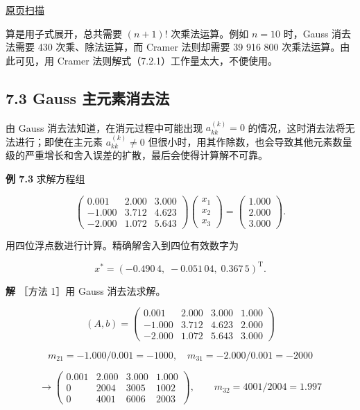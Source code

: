 \documentclass[
  10pt,
  fontset=fandol]{ctexart}
\begin{document}
\href{../../source-images/pdf-184.jpeg}{原页扫描}

算是用子式展开，总共需要 \((n+1)!\) 次乘法运算。例如 \(n=10\) 时，Gauss 消去法需要 430 次乘、除法运算，而 Cramer 法则却需要 39 916 800 次乘法运算。由此可见，用 Cramer 法则解式（7.2.1）工作量太大，不便使用。

\subsection{7.3 Gauss 主元素消去法}\label{gauss-ux4e3bux5143ux7d20ux6d88ux53bbux6cd5}

由 Gauss 消去法知道，在消元过程中可能出现 \(a_{kk}^{(k)}=0\) 的情况，这时消去法将无法进行；即使在主元素 \(a_{kk}^{(k)}\ne0\) 但很小时，用其作除数，也会导致其他元素数量级的严重增长和舍入误差的扩散，最后会使得计算解不可靠。

\textbf{例 7.3} 求解方程组

\[
\begin{pmatrix}
0.001&2.000&3.000\\
-1.000&3.712&4.623\\
-2.000&1.072&5.643
\end{pmatrix}
\begin{pmatrix}x_1\\x_2\\x_3\end{pmatrix}
=\begin{pmatrix}1.000\\2.000\\3.000\end{pmatrix}.
\]

用四位浮点数进行计算。精确解舍入到四位有效数字为

\[x^*=(-0.490\,4,\;-0.051\,04,\;0.367\,5)^{\mathrm T}.\]

\textbf{解} ［方法 1］用 Gauss 消去法求解。

\[
(A,b)=\left(\begin{array}{rrr|r}
0.001&2.000&3.000&1.000\\
-1.000&3.712&4.623&2.000\\
-2.000&1.072&5.643&3.000
\end{array}\right)
\]

\[m_{21}=-1.000/0.001=-1000,\quad m_{31}=-2.000/0.001=-2000\]

\[
\longrightarrow\left(\begin{array}{rrr|r}
0.001&2.000&3.000&1.000\\
0&2004&3005&1002\\
0&4001&6006&2003
\end{array}\right),\qquad m_{32}=4001/2004=1.997
\]
\end{document}

